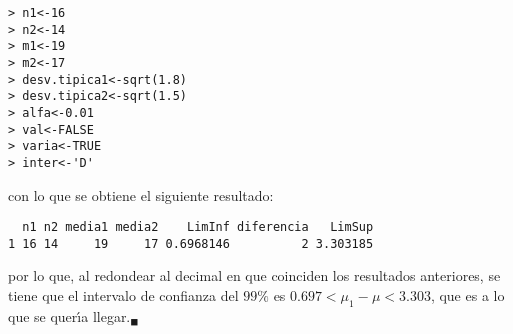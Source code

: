 \begin{solucion}
\begin{verbatim}
> n1<-16
> n2<-14
> m1<-19
> m2<-17
> desv.tipica1<-sqrt(1.8)
> desv.tipica2<-sqrt(1.5)
> alfa<-0.01
> val<-FALSE
> varia<-TRUE
> inter<-'D'
 \end{verbatim}
 \vspace{-0.5cm}
 con lo que se obtiene el siguiente resultado:
 \begin{verbatim}
  n1 n2 media1 media2    LimInf diferencia   LimSup
1 16 14     19     17 0.6968146          2 3.303185
 \end{verbatim}
 \vspace{-0.5cm}
 por lo que, al redondear al decimal en que coinciden los resultados anteriores, se tiene que el intervalo de confianza del $99\%$ es $0.697 < \mu_1 - \mu < 3.303$, que es a lo que se quer\'{\i}a llegar.${}_{\blacksquare}$
\end{solucion}
